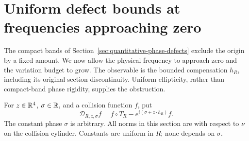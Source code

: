 \section{Uniform defect bounds at frequencies approaching zero}
\label{sec:near-origin-defects}
The compact bands of Section~\ref{sec:quantitative-phase-defects}
exclude the origin by a fixed amount. We now allow the physical
frequency to approach zero and the variation budget to grow. The
observable is the bounded compensation $h_R$, including its original
section discontinuity. Uniform ellipticity, rather than compact-band
phase rigidity, supplies the obstruction.

For $z\in\mathbb R^4$, $\sigma\in\mathbb R$, and a collision function $f$, put
\begin{equation}\label{eq:compensated-defect-definition}
 \mathcal D_{R,z,\sigma}f
       =f\circ T_R-e^{i(\sigma+z\cdot h_R)}f.
\end{equation}
The constant phase $\sigma$ is arbitrary. All norms in this section
are with respect to $\nu$ on the collision cylinder. Constants are
uniform in $R$; none depends on $\sigma$.

